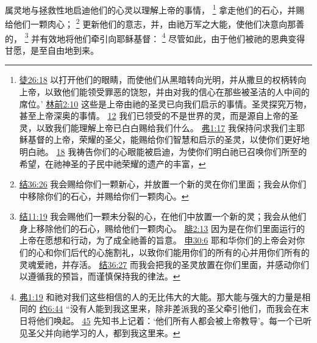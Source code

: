 \documentclass[12pt, a4paper, oneside]{ctexart}
\begin{document}
	属灵地与拯救性地启迪他们的心灵以理解上帝的事情，
	\footnote {
		\href{https://biblehub.com/acts/26-18.htm}{徒26:18} 以打开他们的眼睛，而使他们从黑暗转向光明，并从撒旦的权柄转向上帝，以致他们能领受罪恶的饶恕，并由对我的信心在那些被圣洁的人中间的席位。’
		\href{https://biblehub.com/1_corinthians/2-10.htm}{林前2:10} 这些是上帝由祂的圣灵已向我们启示的事情。圣灵探究万物，甚至上帝深奥的事情。
		\href{https://biblehub.com/1_corinthians/2-12.htm}{12} 我们已领受的不是世界的灵，而是源自上帝的圣灵，以致我们能理解上帝已白白赐给我们什么。
		\href{https://biblehub.com/ephesians/1-17.htm}{弗1:17} 我保持问求我们主耶稣基督的上帝，荣耀的圣父，能赐给你们智慧和启示的圣灵，以使你们更好地明白祂。
		\href{https://biblehub.com/ephesians/1-18.htm}{18} 我祷告你们的心眼能被启迪，为使你们明白祂已召唤你们所至的希望，在祂神圣的子民中祂荣耀的遗产的丰富，
	}
	拿走他们的石心，并赐给他们一颗肉心；
	\footnote {
		\href{https://biblehub.com/ezekiel/36-26.htm}{结36:26} 我会赐给你们一颗新心，并放置一个新的灵在你们里面；我会从你们中移除你们的石心，并赐给你们一颗肉心。
	}
	更新他们的意志，并，由祂万军之大能，使他们决意向那善的，
	\footnote {
		\href{https://biblehub.com/ezekiel/11-19.htm}{结11:19} 我会赐他们一颗未分裂的心，在他们中放置一个新的灵；我会从他们身上移除他们的石心，赐给他们一颗肉心。
		\href{https://biblehub.com/philippians/2-13.htm}{腓2:13} 因为是在你们里面运行的上帝在愿想和行动，为了成全祂善的旨意。
		\href{https://biblehub.com/deuteronomy/30-6.htm}{申30:6} 耶和华你们的上帝会对你们的心和你们后代的心施割礼，以致你们能用你们的所有的心并用你们所有的灵魂爱祂，并存活。
		\href{https://biblehub.com/ezekiel/36-27.htm}{结36:27} 而我会把我的圣灵放置在你们里面，并感动你们以遵循我的预旨，而谨慎保持我的律法。
	}
	并有效地将他们牵引向耶稣基督：
	\footnote {
		\href{https://biblehub.com/ephesians/1-19.htm}{弗1:19} 和祂对我们这些相信的人的无比伟大的大能。那大能与强大的力量是相同的
		\href{https://biblehub.com/john/6-44.htm}{约6:44} “没有人能到我这里来，除非差派我的圣父牵引他们，而我会在末日将他们唤起。
		\href{https://biblehub.com/john/6-45.htm}{45} 先知书上记着：‘他们所有人都会被上帝教导’。每一个已听见圣父并向祂学习的人，都到我这里来。
	}
	尽管如此，由于他们被祂的恩典变得甘愿，是至自由地到来。
\end{document}
